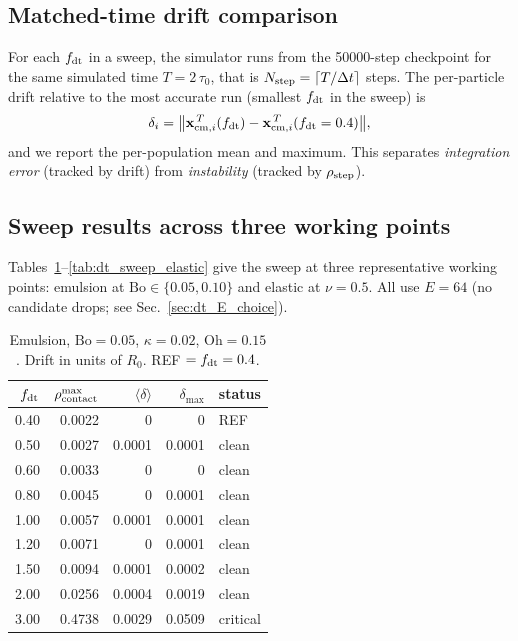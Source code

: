 \documentclass[aps,pre,twocolumn,floatfix,longbibliography]{revtex4-2}
\begin{document}
\subsection{Matched-time drift comparison}
\label{sec:dt_matched_T}

For each $f_{\rm dt}$ in a sweep, the simulator runs from the 50000-step
checkpoint for the same simulated time $T = 2\,\tau_0$, that is
$N_{\rm step} = \lceil T / \Delta t \rceil$ steps.  The per-particle
drift relative to the most accurate run (smallest $f_{\rm dt}$ in the
sweep) is
\begin{equation}
  \delta_i = \bigl\| \mathbf{x}_{{\rm cm}, i}^{\,T}(f_{\rm dt})
  - \mathbf{x}_{{\rm cm}, i}^{\,T}(f_{\rm dt} = 0.4) \bigr\|,
\end{equation}
and we report the per-population mean and maximum.  This separates
\emph{integration error} (tracked by drift) from \emph{instability}
(tracked by $\rho_{\rm step}$).

\subsection{Sweep results across three working points}
\label{sec:dt_sweep_tables}

Tables~\ref{tab:dt_sweep_emul_005}--\ref{tab:dt_sweep_elastic} give the
sweep at three representative working points: emulsion at $\mathrm{Bo}
\in \{0.05, 0.10\}$ and elastic at $\nu = 0.5$.  All use $E = 64$ (no
candidate drops; see Sec.~\ref{sec:dt_E_choice}).

\begin{table}[h]
\caption{Emulsion, $\mathrm{Bo} = 0.05$, $\kappa = 0.02$, $\mathrm{Oh} =
  0.15$.  Drift in units of $R_0$.  REF $= f_{\rm dt} = 0.4$.}
\label{tab:dt_sweep_emul_005}
\begin{ruledtabular}
\begin{tabular}{rrrrl}
  $f_{\rm dt}$ & $\rho_{\rm contact}^{\max}$ & $\langle\delta\rangle$ &
  $\delta_{\max}$ & status \\
\hline
  0.40 & 0.0022 & 0      & 0      & REF \\
  0.50 & 0.0027 & 0.0001 & 0.0001 & clean \\
  0.60 & 0.0033 & 0      & 0      & clean \\
  0.80 & 0.0045 & 0      & 0.0001 & clean \\
  1.00 & 0.0057 & 0.0001 & 0.0001 & clean \\
  1.20 & 0.0071 & 0      & 0.0001 & clean \\
  1.50 & 0.0094 & 0.0001 & 0.0002 & clean \\
  2.00 & 0.0256 & 0.0004 & 0.0019 & clean \\
  3.00 & 0.4738 & 0.0029 & 0.0509 & critical \\
\end{tabular}
\end{ruledtabular}
\end{table}
\end{document}
